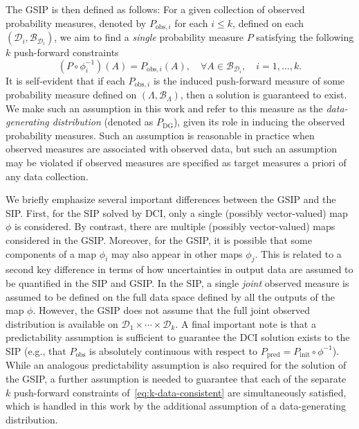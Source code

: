 \documentclass{article}
\newcommand{\B}{\mathcal{B}}
\newcommand{\initmeas}{P_{\text{init}}}
\newcommand{\predictmeas}{P_\text{pred}}
\newcommand{\obsmeas}{P_{\text{obs}}}
\begin{document}
The GSIP is then defined as follows: For a given collection of observed probability measures, denoted by $P_{\text{obs},i}$ for each $i\le k$, defined on each $(\mathcal{D}_i, \B_{\mathcal{D}_i})$, we aim to find a \emph{single} probability measure $P$ satisfying the following $k$ push-forward constraints
\begin{equation}\label{eq:k-data-consistent}
    (P\circ \phi_{i}^{-1})(A) = P_{\text{obs},i}(A), \quad \forall A\in\B_{\mathcal{D}_i}, \quad i =1, \ldots, k. 
\end{equation}
It is self-evident that if each $P_{\text{obs},i}$ is the induced push-forward measure of some probability measure defined on $(\Lambda, \B_\Lambda)$, then a solution is guaranteed to exist.
We make such an assumption in this work and refer to this measure as the {\em data-generating distribution} (denoted as $P_\text{DG}$), given its role in inducing the observed probability measures. 
Such an assumption is reasonable in practice when observed measures are associated with observed data, but such an assumption may be violated if observed measures are specified as target measures a priori of any data collection.

We briefly emphasize several important differences between the GSIP and the SIP.
First, for the SIP solved by DCI, only a single (possibly vector-valued) map $\phi$ is considered. 
By contrast, there are multiple (possibly vector-valued) maps considered in the GSIP. 
Moreover, for the GSIP, it is possible that some components of a map $\phi_i$ may also appear in other maps $\phi_j$.
This is related to a second key difference in terms of how uncertainties in output data are assumed to be quantified in the SIP and GSIP.
In the SIP, a single {\em joint} observed measure is assumed to be defined on the full data space defined by all the outputs of the map $\phi$. 
However, the GSIP does not assume that the full joint observed distribution is available on $\mathcal{D}_1\times\cdots\times\mathcal{D}_k$. 
A final important note is that a predictability assumption is sufficient to guarantee the DCI solution exists to the SIP (e.g., that $\obsmeas$ is absolutely continuous with respect to $\predictmeas=\initmeas\circ\phi^{-1}$). 
While an analogous predictability assumption is also required for the solution of the GSIP, a further assumption is needed to guarantee that each of the separate $k$ push-forward constraints of~\eqref{eq:k-data-consistent} are simultaneously satisfied, which is handled in this work by the additional assumption of a data-generating distribution. 
\end{document}
